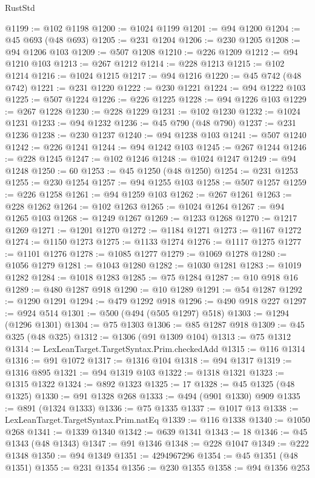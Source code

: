 \begin{lexlean}{RustStd}
\begin{coremodule}
{\begin{coremodule}
{{{{{{{{{{{{{{{{{{{{{{{{{{{{{{{{{{{{{@1199 := @102 @1198
@1200 := @1024 @1199
@1201 := @94 @1200
@1204 := @45 @693 (@48 @693)
@1205 := @231 @1204
@1206 := @230 @1205
@1208 := @94 @1206 @103
@1209 := @507 @1208
@1210 := @226 @1209
@1212 := @94 @1210 @103
@1213 := @267 @1212
@1214 := @228 @1213
@1215 := @102 @1214
@1216 := @1024 @1215
@1217 := @94 @1216
@1220 := @45 @742 (@48 @742)
@1221 := @231 @1220
@1222 := @230 @1221
@1224 := @94 @1222 @103
@1225 := @507 @1224
@1226 := @226 @1225
@1228 := @94 @1226 @103
@1229 := @267 @1228
@1230 := @228 @1229
@1231 := @102 @1230
@1232 := @1024 @1231
@1233 := @94 @1232
@1236 := @45 @790 (@48 @790)
@1237 := @231 @1236
@1238 := @230 @1237
@1240 := @94 @1238 @103
@1241 := @507 @1240
@1242 := @226 @1241
@1244 := @94 @1242 @103
@1245 := @267 @1244
@1246 := @228 @1245
@1247 := @102 @1246
@1248 := @1024 @1247
@1249 := @94 @1248
@1250 := 60
@1253 := @45 @1250 (@48 @1250)
@1254 := @231 @1253
@1255 := @230 @1254
@1257 := @94 @1255 @103
@1258 := @507 @1257
@1259 := @226 @1258
@1261 := @94 @1259 @103
@1262 := @267 @1261
@1263 := @228 @1262
@1264 := @102 @1263
@1265 := @1024 @1264
@1267 := @94 @1265 @103
@1268 := @1249 @1267
@1269 := @1233 @1268
@1270 := @1217 @1269
@1271 := @1201 @1270
@1272 := @1184 @1271
@1273 := @1167 @1272
@1274 := @1150 @1273
@1275 := @1133 @1274
@1276 := @1117 @1275
@1277 := @1101 @1276
@1278 := @1085 @1277
@1279 := @1069 @1278
@1280 := @1056 @1279
@1281 := @1043 @1280
@1282 := @1030 @1281
@1283 := @1019 @1282
@1284 := @1018 @1283
@1285 := @75 @1284
@1287 := @10 @918 @16
@1289 := @480 @1287 @918
@1290 := @10 @1289
@1291 := @54 @1287
@1292 := @1290 @1291
@1294 := @479 @1292 @918
@1296 := @490 @918 @227
@1297 := @924 @514
@1301 := @500 (@494 (@505 @1297) @518)
@1303 := @1294 (@1296 @1301)
@1304 := @75 @1303
@1306 := @85 @1287 @918
@1309 := @45 @325 (@48 @325)
@1312 := @1306 (@91 @1309 @104)
@1313 := @75 @1312
@1314 := LexLeanTarget.TargetSyntax.Prim.checkedAdd
@1315 := @116 @1314
@1316 := @91 @1072
@1317 := @1316 @104
@1318 := @94 @1317
@1319 := @1316 @895
@1321 := @94 @1319 @103
@1322 := @1318 @1321
@1323 := @1315 @1322
@1324 := @892 @1323
@1325 := 17
@1328 := @45 @1325 (@48 @1325)
@1330 := @91 @1328 @268
@1333 := @494 (@901 @1330) @909
@1335 := @891 (@1324 @1333)
@1336 := @75 @1335
@1337 := @1017 @13
@1338 := LexLeanTarget.TargetSyntax.Prim.natEq
@1339 := @116 @1338
@1340 := @1050 @268
@1341 := @1339 @1340
@1342 := @639 @1341
@1343 := 18
@1346 := @45 @1343 (@48 @1343)
@1347 := @91 @1346
@1348 := @228 @1047
@1349 := @222 @1348
@1350 := @94 @1349
@1351 := 4294967296
@1354 := @45 @1351 (@48 @1351)
@1355 := @231 @1354
@1356 := @230 @1355
@1358 := @94 @1356 @253
}}}}}}}}}}}}}}}}}}}}}}}}}}}}}}}}}}}}}
\end{coremodule}}
\end{coremodule}
\end{lexlean}
